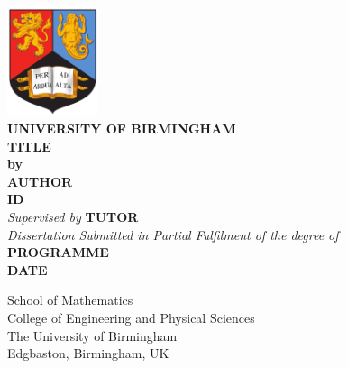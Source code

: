 \begin{titlepage}
    \begin{center}
    \includegraphics[width=0.2\textwidth]{Figures/BirminghamUniversityCrest}\\
    \LARGE \textbf{UNIVERSITY OF BIRMINGHAM}\\[1.25cm]

    \LARGE \textbf{TITLE}\\[0.55cm]

    \large \textbf{by}\\[0.35cm]
    \large \textbf{AUTHOR}\\
    \large \textbf{ID}\\[0.45cm]
    
    \large \textsl{Supervised by} \textbf{TUTOR}\\[2.25cm]
	\normalsize \textsl{Dissertation Submitted in Partial Fulfilment of the degree of} \\
    \large \textbf{PROGRAMME}\\
    \textbf{DATE}\\[5.25cm]
    \end{center}

\begin{flushright}   
School of Mathematics\\
College of Engineering and Physical Sciences\\
The University of Birmingham\\
Edgbaston, Birmingham, UK
\end{flushright}

\end{titlepage}